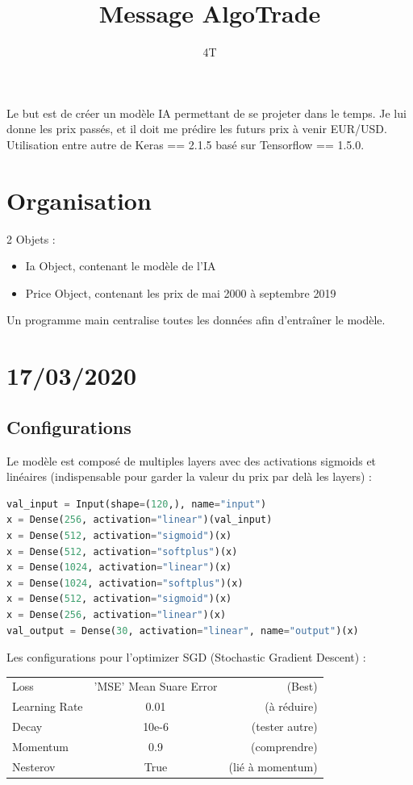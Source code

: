 \documentclass[12pt,a4paper]{article}
\title{Message AlgoTrade}
\author{4T}
\begin{document}
\maketitle
Le but est de créer un modèle IA permettant de se projeter dans le temps. Je lui donne les prix passés, et il doit me prédire les futurs prix à venir EUR/USD. Utilisation entre autre de Keras == 2.1.5 basé sur Tensorflow == 1.5.0.

\section*{Organisation}
2 Objets :
\begin{itemize}
	\item Ia Object, contenant le modèle de l'IA
	\item Price Object, contenant les prix de mai 2000 à septembre 2019
\end{itemize}


Un programme main centralise toutes les données afin d’entraîner le modèle.
 
\newpage
\section*{17/03/2020}

\subsection*{Configurations}
Le modèle est composé de multiples layers avec des activations sigmoids et linéaires (indispensable pour garder la valeur du prix par delà les layers) : \\
\begin{lstlisting}[language=Python, caption=Modèle d'organisation layers]
val_input = Input(shape=(120,), name="input")
x = Dense(256, activation="linear")(val_input)
x = Dense(512, activation="sigmoid")(x)
x = Dense(512, activation="softplus")(x)
x = Dense(1024, activation="linear")(x)
x = Dense(1024, activation="softplus")(x)
x = Dense(512, activation="sigmoid")(x)
x = Dense(256, activation="linear")(x)
val_output = Dense(30, activation="linear", name="output")(x)
\end{lstlisting}

Les configurations pour l'optimizer SGD (Stochastic Gradient Descent) : \\
\begin{tabular}{ l c r }
   	Loss & 'MSE' Mean Suare Error & (Best) \\
	Learning Rate & 0.01 & (à réduire) \\
	Decay & 10e-6 & (tester autre) \\
	Momentum & 0.9 & (comprendre) \\
	Nesterov & True & (lié à momentum) \\
\end{tabular}
\end{document}
